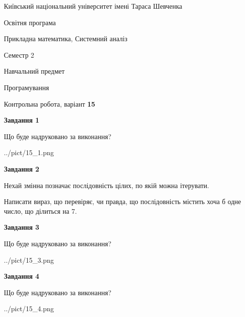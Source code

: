 \documentclass[12pt, ukrainian]{article}
\begin{document}
{{\begin {small}\par
{ \center  Київський національний університет імені Тараса Шевченка \par}
{\parbox {5 cm}{Освітня програма \hfill}{\parbox {8 cm}{Прикладна математика, Системний аналіз \hfill}}\parbox {5 cm}{\hfill Семестр 2}}\par
{\parbox {5 cm} {Навчальний предмет \hfill}\parbox {7 cm}{Програмування \hfill}\parbox {6cm}{\hfill}\par}\vspace{-7pt} \end{small}}{\center Контрольна робота, варіант  \No \textbf
{ 15 }\par}}
{
\begin {large}
{\begin {center}\textbf{Завдання 1}\end {center}}\par
Що буде надруковано за виконання?\par\par
\begin{center}
	{../pict/15_1.png}
\end{center}
\newpage

{\begin {center}\textbf{Завдання 2}\end {center}}\par
Нехай змінна  позначає послідовність цілих, по якій можна ітерувати.

Написати вираз, що перевіряє, чи правда, що послідовність  містить хоча б одне число, що ділиться на 7.\par
\newpage

{\begin {center}\textbf{Завдання 3}\end {center}}\par
Що буде надруковано за виконання?
\begin{center}
	{../pict/15_3.png}
\end{center}
\newpage

{\begin {center}\textbf{Завдання 4}\end {center}}\par
Що буде надруковано за виконання?\par
\begin{center}
	{../pict/15_4.png}
\end{center}
\newpage


\end{large}}
\end{document}
